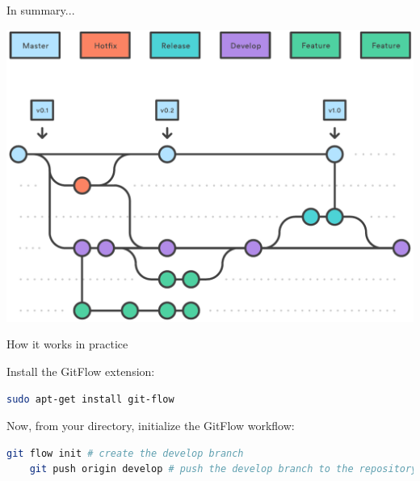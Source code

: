 \documentclass[svgnames]{beamer}
\begin{document}
\begin{frame}{In summary...}

    \begin{center}
        \includegraphics[scale=0.5]{05-_2_.pdf}    
    \end{center}

\end{frame}    

\begin{frame}[fragile]{How it works in practice}

    Install the GitFlow extension:

    \begin{lstlisting}[language=bash]
    sudo apt-get install git-flow
    \end{lstlisting}

    \vspace{1em}
    Now, from your directory, initialize the GitFlow workflow:

    \begin{lstlisting}[language=bash]
    git flow init # create the develop branch
    git push origin develop # push the develop branch to the repository
    \end{lstlisting}

\end{frame}
\end{document}

